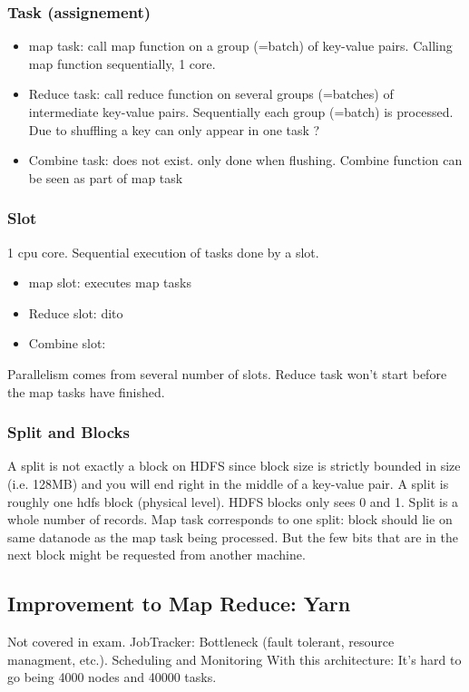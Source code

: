 \subsubsection{Task (assignement)}

\begin{itemize}
    \item map task: call map function on a group (=batch) of key-value pairs. Calling map function sequentially, 1 core.
    \item Reduce task: call reduce function on several groups (=batches) of intermediate key-value pairs.
    Sequentially each group (=batch) is processed. Due to shuffling a key can only appear in one task ?
    \item Combine task: does not exist. only done when flushing. Combine function can be seen as part of map task
\end{itemize}


\subsubsection{Slot}
1 cpu core.  Sequential execution of tasks done by a slot.
\begin{itemize}
    \item map slot: executes map tasks
    \item Reduce slot: dito
    \item Combine slot:
\end{itemize}
Parallelism comes from several number of slots.
Reduce task won't start before the map tasks have finished.


\subsubsection{Split and Blocks}
A split is not exactly a block on HDFS since block size is strictly bounded in size (i.e. 128MB) and you will
end right in the middle of a key-value pair.
A split is roughly one hdfs block (physical level).
HDFS blocks only sees 0 and 1. Split is a whole number of records.
Map task corresponds to one split: block should lie on same datanode as the map task being processed. But the few
bits that are in the next block might be requested from another machine.


\subsection{Improvement to Map Reduce: Yarn}
Not covered in exam.
JobTracker: Bottleneck (fault tolerant, resource managment, etc.). Scheduling and Monitoring
With this architecture: It's hard to go being 4000 nodes and 40000 tasks.


